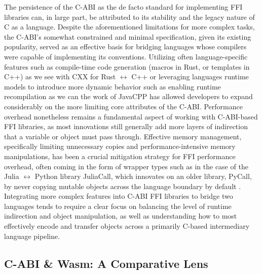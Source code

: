 The persistence of the C-ABI as the de facto standard for implementing FFI libraries can, in large part, be attributed to its stability and the legacy nature of C as a language. Despite the aforementioned limitations for more complex tasks, the C-ABI's somewhat constrained and minimal specification, given its existing popularity, served as an effective basis for bridging languages whose compilers were capable of implementing its conventions. Utilizing often language-specific features such as compile-time code generation (\ie macros in Rust, or templates in C++) as we see with CXX for Rust $\leftrightarrow$ C++ \cite{cxx} or leveraging languages runtime models to introduce more dynamic behavior such as enabling runtime recompilation as we can the work of JavaCPP \cite{javacpp} has allowed developers to expand considerably on the more limiting core attributes of the C-ABI. Performance overhead nonetheless remains a fundamental aspect of working with C-ABI-based FFI libraries, as most innovations still generally add more layers of indirection that a variable or object must pass through. Effective memory management, specifically limiting unnecessary copies and performance-intensive memory manipulations, has been a crucial mitigation strategy for FFI performance overhead, often coming in the form of wrapper types such as in the case of the Julia $\leftrightarrow$ Python library JuliaCall, which innovates on an older library, PyCall, by never copying mutable objects across the language boundary by default \cite{juliacall}. Integrating more complex features into C-ABI FFI libraries to bridge two languages tends to require a clear focus on balancing the level of runtime indirection and object manipulation, as well as understanding how to most effectively encode and transfer objects across a primarily C-based intermediary language pipeline.   

\subsection{C-ABI \& Wasm: A Comparative Lens}\label{s:practical_interop_c_abi_and_wasm}

